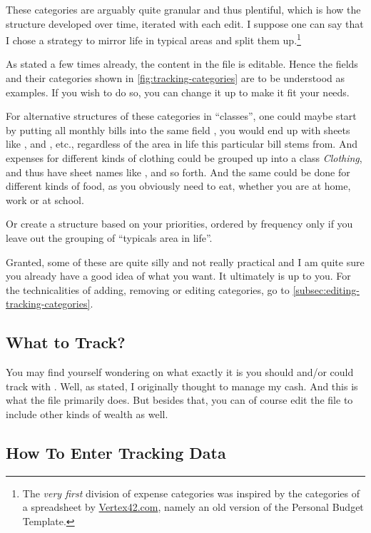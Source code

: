 These categories are arguably quite granular and thus plentiful, which is how the structure developed over time, iterated with each edit.
I suppose one can say that I chose a strategy to mirror life in typical areas and split them up.\footnote{The \emph{very first} division of expense categories was inspired by the categories of a spreadsheet by \href{https://www.vertex42.com/}{Vertex42.com}, namely an old version of the Personal Budget Template.}

As stated a few times already, the content in the file is editable.
Hence the fields and their categories shown in \autoref{fig:tracking-categories} are to be understood as examples.
If you wish to do so, you can change it up to make it fit your needs.

For alternative structures of these categories in ``classes'', one could maybe start by putting all monthly bills into the same field , \ie you would end up with sheets like ,  and , etc., regardless of the area in life this particular bill stems from.
And expenses for different kinds of clothing could be grouped up into a class \emph{Clothing}, and thus have sheet names like ,  and so forth.
And the same could be done for different kinds of food, as you obviously need to eat, whether you are at home, work or at school.

Or create a structure based on your priorities, ordered by frequency only if you leave out the grouping of ``typicals area in life''.

Granted, some of these are quite silly and not really practical and I am quite sure you already have a good idea of what you want.
It ultimately is up to you.
For the technicalities of adding, removing or editing categories, go to \autoref{subsec:editing-tracking-categories}.

\subsection{What to Track?}
\label{subsec:what-to-track}

You may find yourself wondering on what exactly it is you should and/or could track with \tfn.
Well, as stated, I originally thought to manage my cash.
And this is what the file primarily does.
But besides that, you can of course edit the file to include other kinds of wealth as well.

\subsection{How To Enter Tracking Data}
\label{subsec:enter-tracking-data}

